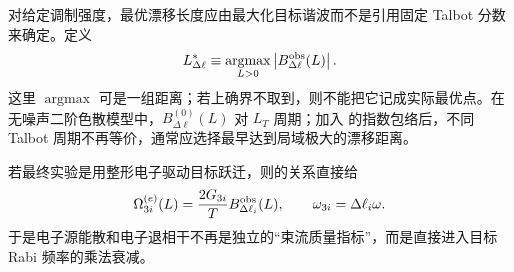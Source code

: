 对给定调制强度，最优漂移长度应由最大化目标谐波而不是引用固定 Talbot 分数来确定。定义
\begin{equation}
{
 L_{\Delta\ell}^*\equiv\underset{L>0}{\operatorname{argmax}}
 \left|B_{\Delta\ell}^{\rm obs}(L)\right| .}
\label{eq:optimal_bunching_length_dp47}
\end{equation}
这里 $\operatorname{argmax}$ 可是一组距离；若上确界不取到，则不能把它记成实际最优点。在无噪声二阶色散模型中，$B_{\Delta\ell}^{(0)}(L)$ 对 $L_T$ 周期；加入 的指数包络后，不同 Talbot 周期不再等价，通常应选择最早达到局域极大的漂移距离。

若最终实验是用整形电子驱动目标跃迁，则的关系直接给
\begin{equation}
{
 \Omega_{3i}^{(e)}(L)
 =\frac{2G_{3i}}{T}B_{\Delta\ell_i}^{\rm obs}(L),
 \qquad
 \omega_{3i}=\Delta\ell_i \omega .}
\label{eq:target_rabi_with_decoherence_dp47}
\end{equation}
于是电子源能散和电子退相干不再是独立的“束流质量指标”，而是直接进入目标 Rabi 频率的乘法衰减。



